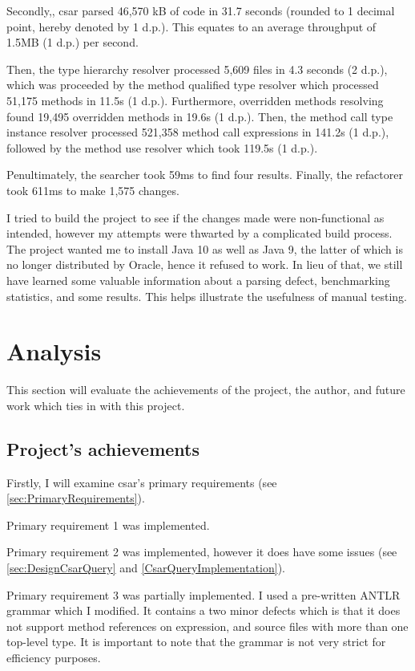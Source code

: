 \documentclass[12pt, letterpaper]{article}
\begin{document}
Secondly,, csar parsed 46,570 kB of code in 31.7 seconds (rounded to 1 decimal point, hereby denoted by 1 d.p.).
This equates to an average throughput of 1.5MB (1 d.p.) per second.

Then, the type hierarchy resolver processed 5,609 files in 4.3 seconds (2 d.p.), which was proceeded by the method qualified type resolver which processed 51,175 methods in 11.5s (1 d.p.).
Furthermore, overridden methods resolving found 19,495 overridden methods in 19.6s (1 d.p.).
Then, the method call type instance resolver processed 521,358 method call expressions in 141.2s (1 d.p.), followed by the method use resolver which took 119.5s (1 d.p.).

Penultimately, the searcher took 59ms to find four results.
Finally, the refactorer took 611ms to make 1,575 changes.

I tried to build the project to see if the changes made were non-functional as intended, however my attempts were thwarted by a complicated build process.
The project wanted me to install Java 10 as well as Java 9, the latter of which is no longer distributed by Oracle, hence it refused to work.
In lieu of that, we still have learned some valuable information about a parsing defect, benchmarking statistics, and some results.
This helps illustrate the usefulness of manual testing.

\section{Analysis}
This section will evaluate the achievements of the project, the author, and future work which ties in with this project.

\subsection{Project's achievements}
Firstly, I will examine csar's primary requirements (see \ref{sec:PrimaryRequirements}).

Primary requirement 1 was implemented. 

Primary requirement 2 was implemented, however it does have some issues (see \ref{sec:DesignCsarQuery} and \ref{CsarQueryImplementation}).

Primary requirement 3 was partially implemented.
I used a pre-written ANTLR grammar which I modified.
It contains a two minor defects which is that it does not support method references on expression, and source files with more than one top-level type.
It is important to note that the grammar is not very strict for efficiency purposes.
\end{document}
